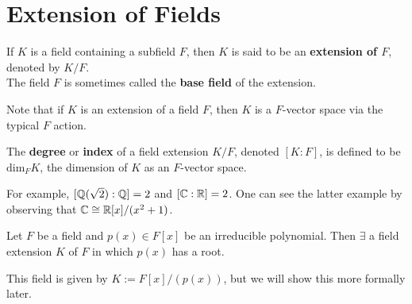 \documentclass{memoir}
\begin{document}


\section{Extension of Fields}
\label{sec:extension_of_fields}

\begin{defn}
	If \(K\) is a field containing a subfield \(F\), then \(K\) is said to be an \textbf{extension of \(F\)}, denoted by \(K / F\).\\

	The field \(F\) is sometimes called the \textbf{base field} of the extension.
\end{defn}
Note that if \(K\) is an extension of a field \(F\), then \(K\) is a \(F\)-vector space via the typical \(F\) action.

\begin{defn}
	The \textbf{degree} or \textbf{index} of a field extension \(K / F\), denoted \([K:F]\), is defined to be \(\textrm{dim}_F K\), the dimension of \(K\) as an \(F\)-vector space.
\end{defn}
For example, \([\mathbb{Q}(\sqrt{2} ) : \mathbb{Q}] = 2\) and \([\mathbb{C}: \mathbb{R}] = 2\). One can see the latter example by observing that \(\mathbb{C}\cong \mathbb{R}[x] / (x^2+1)\).

\begin{thm}
	Let \(F\) be a field and \(p(x) \in F[x]\) be an irreducible polynomial. Then \(\exists \) a field extension \(K\) of \(F\) in which \(p(x)\) has a root.
\end{thm}
This field is given by \(K := F[x] / (p(x))\), but we will show this more formally later.
\end{document}
